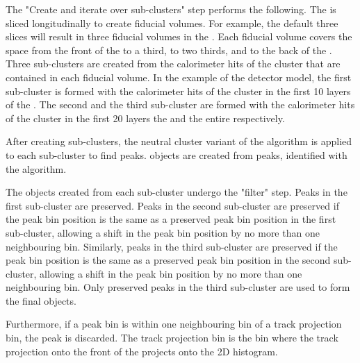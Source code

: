 The "Create and iterate over sub-clusters" step performs the following. The \ECAL is sliced longitudinally to create fiducial volumes. For example, the default three slices will result in three  fiducial volumes in the \ECAL. Each fiducial volume covers the  space from the front of the \ECAL to a third, to two thirds, and to the back of the \ECAL. Three sub-clusters are created from the calorimeter hits of the cluster that are contained in each fiducial volume. In the example of the \ILD detector model, the first sub-cluster is formed with the  calorimeter hits of the cluster in the first 10 layers of the \ECAL. The second and the third sub-cluster are formed with the  calorimeter hits of the cluster in the first 20 layers  the \ECAL and the entire \ECAL respectively.

After creating sub-clusters, the neutral cluster variant of the  \peakFinding algorithm is applied to each sub-cluster to find peaks. \ShowerPeak objects are created from peaks, identified with the  \peakFinding algorithm.


The \ShowerPeak objects created from each sub-cluster undergo the "\ShowerPeak filter" step. Peaks in the first sub-cluster are preserved. Peaks in the second sub-cluster are preserved if the peak bin position is the same as a preserved peak bin position in the first sub-cluster, allowing a shift in the peak bin position by no more than one neighbouring bin. Similarly, peaks in the third sub-cluster are preserved if the peak bin position is the same as a preserved peak bin position in the second sub-cluster, allowing a shift in the peak bin position by no more than one neighbouring bin. Only preserved peaks in the third sub-cluster are used to form the final \ShowerPeak objects.

Furthermore, if a peak bin is within one neighbouring bin of a track projection bin, the peak is discarded. The track projection bin  is the bin where the track projection onto the front of the \ECAL projects onto the 2D histogram.




